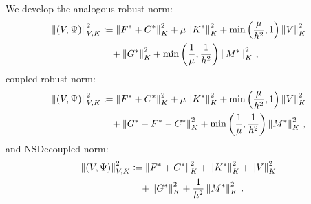 \documentclass[Dissertation.tex]{subfiles}
\begin{document}
We develop the analogous robust norm:
\begin{align*}
\left\| \left( V,\Psi \right) \right\|_{V,K}^2 &\coloneqq
\left\| F^*+C^* \right\|_K^2
+ \mu\left\| K^* \right\|_K^2
+ \min\left( \frac{\mu}{h^2},1 \right)\left\| V \right\|^2_K
\\\nonumber&\quad
+ \left\| G^* \right\|_K^2
+ \min\left( \frac{1}{\mu},\frac{1}{h^2} \right)\left\| M^* \right\|_K^2\,,
\end{align*}
coupled robust norm:
\begin{align*}
\left\| \left( V,\Psi \right) \right\|_{V,K}^2 &\coloneqq
\left\| F^*+C^* \right\|_K^2
+ \mu\left\| K^* \right\|_K^2
+ \min\left( \frac{\mu}{h^2},1 \right)\left\| V \right\|^2_K
\\\nonumber&\quad
+ \left\| G^*-F^*-C^* \right\|_K^2
+ \min\left( \frac{1}{\mu},\frac{1}{h^2} \right)\left\| M^* \right\|_K^2\,,
\end{align*}
and NSDecoupled norm:
\begin{align*}
\left\| \left( V,\Psi \right) \right\|_{V,K}^2 &\coloneqq
\left\| F^*+C^* \right\|_K^2
+ \left\| K^* \right\|_K^2
+ \left\| V \right\|^2_K
\\\nonumber&\quad
+ \left\| G^* \right\|_K^2
+ \frac{1}{h^2}\left\| M^* \right\|_K^2\,.
\end{align*}
\end{document}
